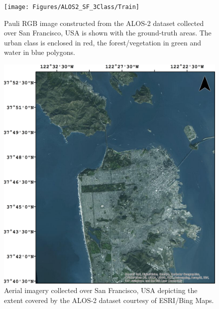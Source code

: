 \begin{figure}[!htb]
\centering
		\texttt{[image: Figures/ALOS2\_SF\_3Class/Train]}
		\caption{Pauli RGB image constructed from the ALOS-2 dataset collected over San Francisco, USA is shown with the ground-truth areas. The urban class is enclosed in red, the forest/vegetation in green and water in blue polygons.}
		\label{fig:train1alos2}
\end{figure}

\begin{figure}[!b]
\centering
		\includegraphics[width=0.5\columnwidth]{Figures/SF}
		\caption{Aerial imagery collected over San Francisco, USA depicting the extent covered by the ALOS-2 dataset courtesy of ESRI/Bing Maps.}
		\label{fig:OpticalAlos2}
\end{figure}

